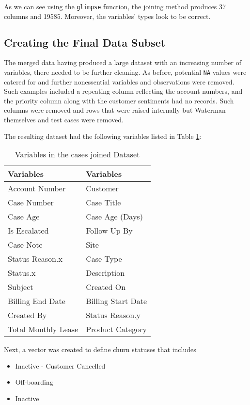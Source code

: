 \documentclass[
]{article}
\providecommand{\tightlist}{%
  \setlength{\itemsep}{0pt}\setlength{\parskip}{0pt}}
\begin{document}
As we can see using the \texttt{glimpse} function, the joining method produces 37 columns and 19585. Moreover, the variables' types look to be correct.

\subsection{Creating the Final Data Subset}\label{creating-the-final-data-subset}

The merged data having produced a large dataset with an increasing number of variables, there needed to be further cleaning. As before, potential \texttt{NA} values were catered for and further nonessential variables and observations were removed. Such examples included a repeating column reflecting the account numbers, and the priority column along with the customer sentiments had no records. Such columns were removed and rows that were raised internally but Waterman themselves and test cases were removed.

The resulting dataset had the following variables listed in Table \ref{tab:var-table-joined}:

\begin{table}

\caption{\label{tab:var-table-joined}Variables in the cases joined Dataset}
\centering
\begin{tabular}[t]{l|l}
\hline
Variables & Variables\\
\hline
Account Number & Customer\\
\hline
Case Number & Case Title\\
\hline
Case Age & Case Age (Days)\\
\hline
Is Escalated & Follow Up By\\
\hline
Case Note & Site\\
\hline
Status Reason.x & Case Type\\
\hline
Status.x & Description\\
\hline
Subject & Created On\\
\hline
Billing End Date & Billing Start Date\\
\hline
Created By & Status Reason.y\\
\hline
Total Monthly Lease & Product Category\\
\hline
\end{tabular}
\end{table}

Next, a vector was created to define churn statuses that includes

\begin{itemize}
\tightlist
\item
  Inactive - Customer Cancelled
\item
  Off-boarding
\item
  Inactive
\end{itemize}
\end{document}
